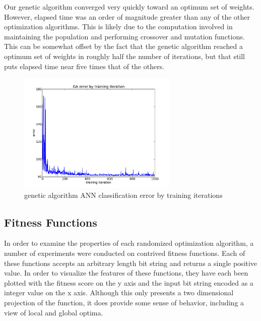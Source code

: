 \documentclass{sig-alternate}
\begin{document}
Our genetic algorithm converged very quickly toward an optimum set of weights. However, elapsed time was an order of magnitude greater than any of the other optimization algorithms. This is likely due to the computation involved in maintaining the population and performing crossover and mutation functions. This can be somewhat offset by the fact that the genetic algorithm reached a optimum set of weights in roughly half the number of iterations, but that still puts elapsed time near five times that of the others.

\begin{figure}[!htbp]
    \centering
    \includegraphics[width=3in]{part1.1/error-ga.pdf}
    \caption{genetic algorithm ANN classification error by training iterations \label{error-ga}}
\end{figure} 




\subsection{Fitness Functions}

In order to examine the properties of each randomized optimization algorithm, a number of experiments were conducted on contrived fitness functions. Each of these functions accepts an arbitrary length bit string and returns a single positive value. In order to visualize the features of these functions, they have each been plotted with the fitness score on the y axis and the input bit string encoded as a integer value on the x axis. Although this only presents a two dimensional projection of the function, it does provide some sense of behavior, including a view of local and global optima. 
\end{document}
